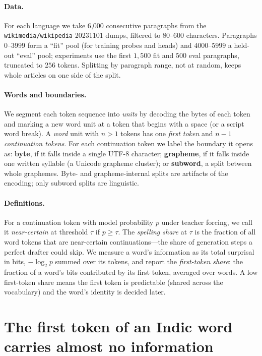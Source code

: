 \documentclass[11pt]{article}
\begin{document}
\paragraph{Data.} For each language we take 6{,}000 consecutive paragraphs from
the \texttt{wikimedia/wikipedia} 20231101 dumps, filtered to $80$--$600$
characters. Paragraphs $0$--$3999$ form a ``fit'' pool (for training probes and
heads) and $4000$--$5999$ a held-out ``eval'' pool; experiments use the first
$1{,}500$ fit and $500$ eval paragraphs, truncated to $256$ tokens. Splitting
by paragraph range, not at random, keeps whole articles on one side of the
split.

\paragraph{Words and boundaries.} We segment each token sequence into
\emph{units} by decoding the bytes of each token and marking a new word unit at
a token that begins with a space (or a script word break). A \emph{word} unit
with $n>1$ tokens has one \emph{first token} and $n-1$ \emph{continuation
tokens}. For each continuation token we label the boundary it opens as:
\textbf{byte}, if it falls inside a single UTF-8 character; \textbf{grapheme},
if it falls inside one written syllable (a Unicode grapheme cluster); or
\textbf{subword}, a split between whole graphemes. Byte- and grapheme-internal
splits are artifacts of the encoding; only subword splits are linguistic.

\paragraph{Definitions.} For a continuation token with model probability $p$
under teacher forcing, we call it \emph{near-certain} at threshold $\tau$ if
$p \ge \tau$. The \emph{spelling share} at $\tau$ is the fraction of all word
tokens that are near-certain continuations---the share of generation steps a
perfect drafter could skip. We measure a word's information as its total
surprisal in bits, $-\log_2 p$ summed over its tokens, and report the
\emph{first-token share}: the fraction of a word's bits contributed by its
first token, averaged over words. A low first-token share means the first token
is predictable (shared across the vocabulary) and the word's identity is
decided later.

\section{The first token of an Indic word carries almost no information}
\label{sec:spelling}
\end{document}
